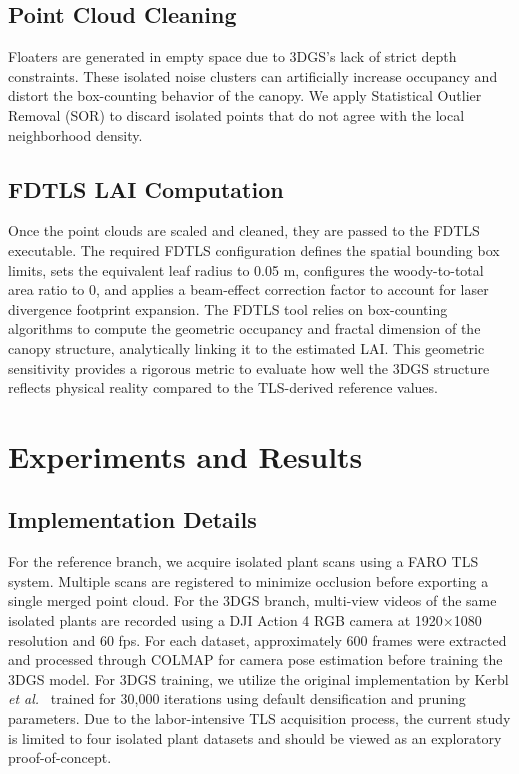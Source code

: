 \documentclass[10pt,twocolumn,letterpaper]{article}
\begin{document}
\subsection{Point Cloud Cleaning}
Floaters are generated in empty space due to 3DGS's lack of strict depth constraints. These isolated noise clusters can artificially increase occupancy and distort the box-counting behavior of the canopy. We apply Statistical Outlier Removal (SOR) to discard isolated points that do not agree with the local neighborhood density.

\subsection{FDTLS LAI Computation}
Once the point clouds are scaled and cleaned, they are passed to the FDTLS executable. The required FDTLS configuration defines the spatial bounding box limits, sets the equivalent leaf radius to 0.05 m, configures the woody-to-total area ratio to 0, and applies a beam-effect correction factor to account for laser divergence footprint expansion. The FDTLS tool relies on box-counting algorithms to compute the geometric occupancy and fractal dimension of the canopy structure, analytically linking it to the estimated LAI. This geometric sensitivity provides a rigorous metric to evaluate how well the 3DGS structure reflects physical reality compared to the TLS-derived reference values.

\section{Experiments and Results}

\subsection{Implementation Details}
For the reference branch, we acquire isolated plant scans using a FARO TLS system. Multiple scans are registered to minimize occlusion before exporting a single merged point cloud. For the 3DGS branch, multi-view videos of the same isolated plants are recorded using a DJI Action 4 RGB camera at 1920$\times$1080 resolution and 60 fps. For each dataset, approximately 600 frames were extracted and processed through COLMAP for camera pose estimation before training the 3DGS model. For 3DGS training, we utilize the original implementation by Kerbl \textit{et al.}~\cite{kerbl20233d} trained for 30,000 iterations using default densification and pruning parameters. Due to the labor-intensive TLS acquisition process, the current study is limited to four isolated plant datasets and should be viewed as an exploratory proof-of-concept.
\end{document}
